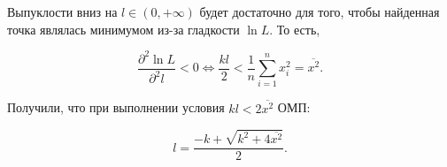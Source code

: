 \documentclass[14pt]{extarticle}
\begin{document}
Выпуклости вниз на $l\in(0, +\infty)$ будет достаточно для того, чтобы найденная точка являлась минимумом из-за гладкости $\ln L$. То есть,

\begin{equation*}
    \frac{\partial^2 \ln L}{\partial^2 l} < 0 \Leftrightarrow \frac{kl}{2} < \frac{1}{n}\sum\limits_{i=1}^n x_i^2 = \overline{x^2}.
\end{equation*}

Получили, что при выполнении условия $kl < 2\overline{x^2}$ ОМП:

\begin{equation*}
    l = \frac{-k + \sqrt{k^2 + 4\overline{x^2}}}{2}.
\end{equation*}
\end{document}
